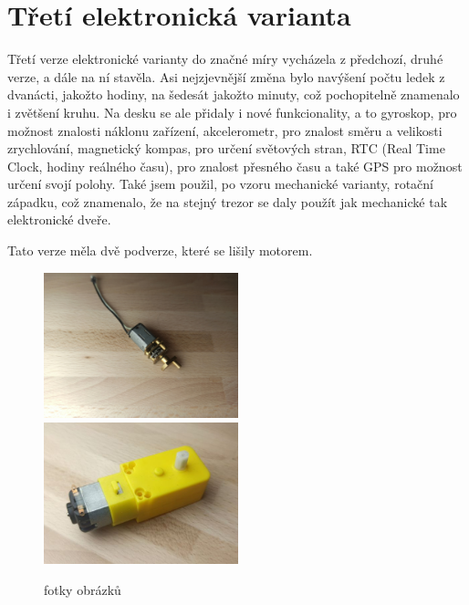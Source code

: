 \section{Třetí elektronická varianta}


Třetí verze elektronické varianty do značné míry vycházela z předchozí, druhé verze, a dále na ní stavěla. Asi nejzjevnější změna bylo navýšení počtu 
ledek z dvanácti, jakožto hodiny, na šedesát jakožto minuty, což pochopitelně znamenalo i zvětšení kruhu. Na desku se ale přidaly i nové funkcionality,
a to gyroskop, pro možnost znalosti náklonu zařízení, akcelerometr, pro znalost směru a velikosti zrychlování, magnetický kompas, pro určení světových
stran, RTC (Real Time Clock, hodiny reálného času), pro znalost přesného času a také GPS pro možnost určení svojí polohy.
Také jsem použil, po vzoru mechanické varianty, rotační západku, což znamenalo, že na stejný trezor se daly použít jak mechanické tak 
elektronické dveře.

Tato verze měla dvě podverze, které se lišily motorem.
\begin{figure}[htbp]
    \centering
    \includegraphics[width=160pt]{kapitoly/obrazky/E3/motory/hodinovyStrojek.jpg}
    \includegraphics[width=160pt]{kapitoly/obrazky/E3/motory/zluty_motor.jpg}
    \caption{fotky obrázků}
    \label{fig:E3-motory}
\end{figure}

